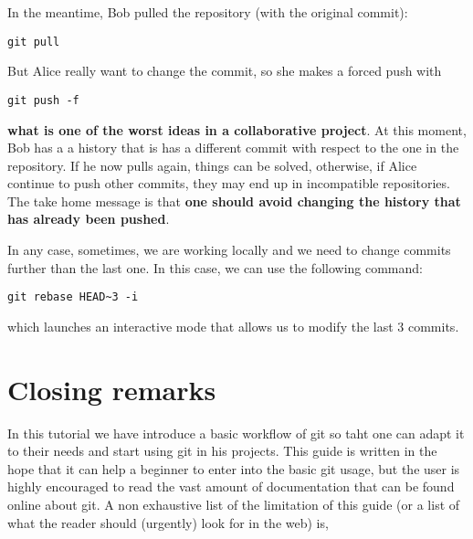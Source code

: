 \documentclass[a4paper,10pt]{article}
\begin{document}
In the meantime, Bob pulled the repository (with the original commit):

\begin{lstlisting}[style=Bob]
 git pull
\end{lstlisting}

But Alice really want to change the commit, so she makes a forced push with

\begin{lstlisting}[style=Alice]
 git push -f
\end{lstlisting}
\textbf{what is one of the worst ideas in a collaborative project}. At this moment, Bob has a a history that is has a different commit with respect to the one in the repository. If he now pulls again, things can be solved, otherwise, if Alice continue to push other commits, they may end up in incompatible repositories. The take home message is that \textbf{one should avoid changing the history that has already been pushed}.

In any case, sometimes, we are working locally and we need to change commits further than the last one. In this case, we can use the following command:

\begin{lstlisting}[style=Alice]
 git rebase HEAD~3 -i
\end{lstlisting}
which launches an interactive mode that allows us to modify the last 3 commits. 

\clearpage

\section{Closing remarks}

In this tutorial we have introduce a basic workflow of git so taht one can adapt it to their needs and start using git in his projects. This guide is written in the hope that it can help a beginner to enter into the basic git usage, but the user is highly encouraged to read the vast amount of documentation that can be found online about git. A non exhaustive list of the limitation of this guide (or a list of what the reader should (urgently) look for in the web) is,
\end{document}
